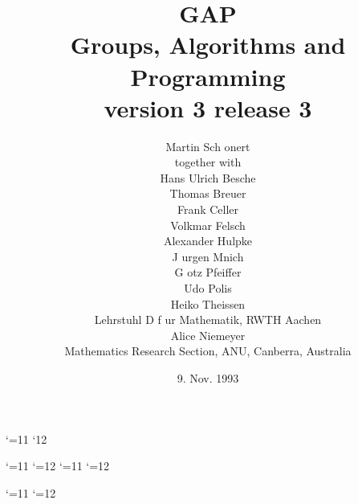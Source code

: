 {{{{{{{{\title{GAP \\
Groups, Algorithms and Programming \\
version 3 release 3}
\author{
Martin Sch{ o}nert \\
together with \\
Hans Ulrich Besche \\
Thomas Breuer \\
Frank Celler \\
Volkmar Felsch \\
Alexander Hulpke \\
J{ u}rgen Mnich \\
G{ o}tz Pfeiffer \\
Udo Polis \\
Heiko Theissen \\
Lehrstuhl D f{ u}r Mathematik, RWTH Aachen \\
Alice Niemeyer \\
Mathematics Research Section, ANU, Canberra, Australia }
\date{9. Nov. 1993}

\maketitle


%


%


\newcommand{\ignoretwoarguments}[2]{}
\catcode`\@=11
\def\l@section{\ignoretwoarguments}
\catcode`\@12

\catcode`\@=11
\@fileswfalse
\catcode`\@=12
\tableofcontents
\catcode`\@=11
\@fileswtrue
\catcode`\@=12

\catcode`\@=11
\def\l@section{\@dottedtocline{1}{1.5em}{4em}}
\catcode`\@=12

}}}}}}}}
